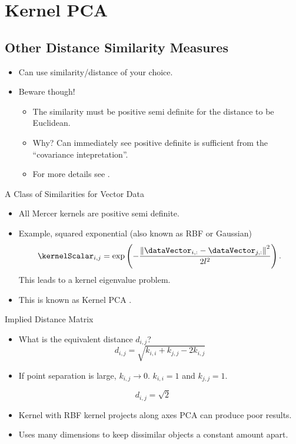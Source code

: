 \section{Kernel PCA}

\subsection{Other Distance Similarity Measures}
\begin{itemize}
\item Can use similarity/distance of your choice.
\item Beware though!

\begin{itemize}
\item The similarity must be positive semi definite for the distance to
be Euclidean.
\item Why? Can immediately see positive definite is sufficient from the
{}``covariance intepretation''.
\item For more details see \cite[Theorem 14.2.2]{Mardia:multivariate79}.
\end{itemize}
\end{itemize}
A Class of Similarities for Vector Data
\begin{itemize}
\item All Mercer kernels are positive semi definite.
\item Example, squared exponential (also known as RBF or Gaussian)\[
\kernelScalar_{i,j}=\exp\left(-\frac{\left\Vert \dataVector_{i,:}-\dataVector_{j,:}\right\Vert ^{2}}{2l^{2}}\right).\]
This leads to a kernel eigenvalue problem.
\item This is known as Kernel PCA \cite{Scholkopf:nonlinear98}.
\end{itemize}
Implied Distance Matrix
\begin{itemize}
\item What is the equivalent distance $d_{i,j}$?\[
d_{i,j}=\sqrt{k_{i,i}+k_{j,j}-2k_{i,j}}\]

\item If point separation is large, $k_{i,j}\rightarrow0$. $k_{i,i}=1$
and $k_{j,j}=1$.
\end{itemize}
\[
d_{i,j}=\sqrt{2}\]

\begin{itemize}
\item Kernel with RBF kernel projects along axes PCA can produce poor results.
\item Uses many dimensions to keep dissimilar objects a constant amount
apart.
\end{itemize}

